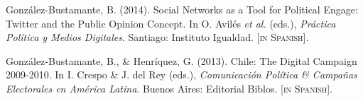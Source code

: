\begin{publications}
\begin{benumerate}{13}
\item{\small Gonz\'alez-Bustamante, B. (2014). Social Networks as a Tool for Political Engage: Twitter and the Public Opinion Concept. In O. Avil\'es {\itshape et al.} (eds.), {\itshape Pr\'actica Pol\'itica y Medios Digitales}. Santiago: Instituto Igualdad. {\footnotesize \scshape [in Spanish]}.}\vspace{1mm}

\item{\small Gonz\'alez-Bustamante, B., \& Henr\'iquez, G. (2013). Chile: The Digital Campaign 2009-2010. In I. Crespo \& J. del Rey (eds.), {\itshape Comunicaci\'on Pol\'itica \& Campa\~nas Electorales en Am\'erica Latina}. Buenos Aires: Editorial Biblos. {\footnotesize \scshape [in Spanish].}}\vspace{1mm}

\end{benumerate}

\end{publications}